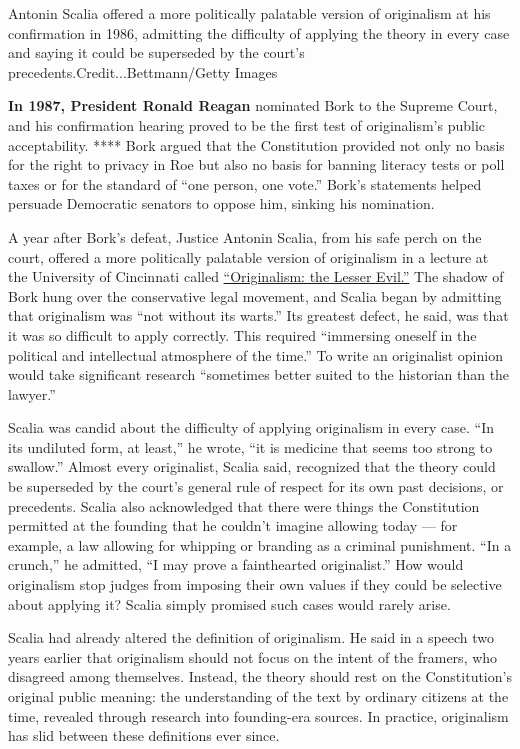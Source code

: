 Antonin Scalia offered a more politically palatable version of
originalism at his confirmation in 1986, admitting the difficulty of
applying the theory in every case and saying it could be superseded by
the court's precedents.Credit...Bettmann/Getty Images

\textbf{In 1987, President Ronald Reagan} nominated Bork to the Supreme
Court, and his confirmation hearing proved to be the first test of
originalism's public acceptability. **** Bork argued that the
Constitution provided not only no basis for the right to privacy in Roe
but also no basis for banning literacy tests or poll taxes or for the
standard of ``one person, one vote.'' Bork's statements helped persuade
Democratic senators to oppose him, sinking his nomination.

A year after Bork's defeat, Justice Antonin Scalia, from his safe perch
on the court, offered a more politically palatable version of
originalism in a lecture at the University of Cincinnati called
\href{https://alumni.northeastern.edu/wp-content/uploads/2019/04/Antonin-Scalia-Originalism-The-Lesser-Evil.pdf}{``Originalism:
the Lesser Evil.''} The shadow of Bork hung over the conservative legal
movement, and Scalia began by admitting that originalism was ``not
without its warts.'' Its greatest defect, he said, was that it was so
difficult to apply correctly. This required ``immersing oneself in the
political and intellectual atmosphere of the time.'' To write an
originalist opinion would take significant research ``sometimes better
suited to the historian than the lawyer.''

Scalia was candid about the difficulty of applying originalism in every
case. ``In its undiluted form, at least,'' he wrote, ``it is medicine
that seems too strong to swallow.'' Almost every originalist, Scalia
said, recognized that the theory could be superseded by the court's
general rule of respect for its own past decisions, or precedents.
Scalia also acknowledged that there were things the Constitution
permitted at the founding that he couldn't imagine allowing today ---
for example, a law allowing for whipping or branding as a criminal
punishment. ``In a crunch,'' he admitted, ``I may prove a fainthearted
originalist.'' How would originalism stop judges from imposing their own
values if they could be selective about applying it? Scalia simply
promised such cases would rarely arise.

Scalia had already altered the definition of originalism. He said in a
speech two years earlier that originalism should not focus on the intent
of the framers, who disagreed among themselves. Instead, the theory
should rest on the Constitution's original public meaning: the
understanding of the text by ordinary citizens at the time, revealed
through research into founding-era sources. In practice, originalism has
slid between these definitions ever since.


